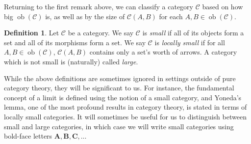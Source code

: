 \documentclass[10pt,oneside]{book}
\def\~#1{\mathscr{#1}}
\newcommand{\ob}{\mathop{\mathrm{ob}}}
\theoremstyle{plain}
\theoremstyle{definition}
\newtheorem{defn}[thm]{Definition}
\theoremstyle{remark}
\numberwithin{equation}{section}
\numberwithin{figure}{section}
\begin{document}
Returning to the first remark above, we can classify a category $\~C$ based on how big $\ob(\~C)$ is, as well as by the size of $\~C(A, B)$ for each $A, B \in \ob(\~C)$.

\begin{defn}
    Let $\~C$ be a category. We say $\~C$ is \emph{small} if all of its objects form a set and all of its morphisms form a set. We say $\~C$ is \emph{locally small} if for all $A, B \in \ob(\~C)$, $\~C(A, B)$ contains only a set's worth of arrows. A category which is not small is (naturally) called \emph{large}.
\end{defn}

While the above definitions are sometimes ignored in settings outside of pure category theory, they will be significant to us. For instance, the fundamental concept of a limit is defined using the notion of a small category, and Yoneda's lemma, one of the most profound results in category theory, is stated in terms of locally small categories. It will sometimes be useful for us to distinguish between small and large categories, in which case we will write small categories using bold-face letters $\mathbf{A}, \mathbf{B}, \mathbf{C}, \ldots$
\end{document}
